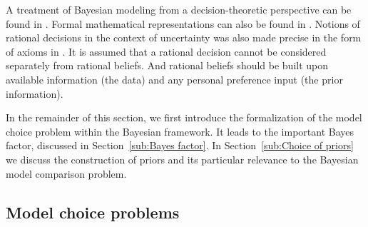 A treatment of Bayesian modeling from a decision-theoretic perspective can be
found in \cite{Robert:2007tc}. Formal mathematical representations can also
be found in \cite[][sec.~5.1 and sec.~6.1]{Bernardo:1994vd}. Notions of
rational decisions in the context of uncertainty was also made precise in the
form of axioms in \cite{DeFinetti:1974tg,DeFinetti:1975ua}. It is assumed
that a rational decision cannot be considered separately from rational
beliefs. And rational beliefs should be built upon available information (the
data) and any personal preference input (the prior information).

In the remainder of this section, we first introduce the formalization of the
model choice problem within the Bayesian framework. It leads to the important
Bayes factor, discussed in Section~\ref{sub:Bayes factor}. In
Section~\ref{sub:Choice of priors} we discuss the construction of priors and
its particular relevance to the Bayesian model comparison problem.

\subsection{Model choice problems}
\label{sub:Model choice problems}

